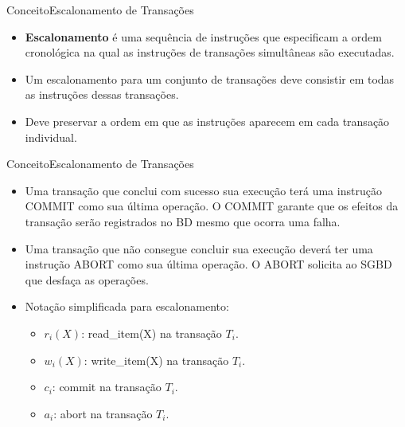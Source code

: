 \documentclass[t]{beamer}
\begin{document}

\begin{ftst}{Conceito}{Escalonamento de Transações}

\begin{itemize}
    \item \textbf{Escalonamento} é uma sequência de instruções que especificam a ordem cronológica na qual as instruções de transações simultâneas são executadas.
    \item Um escalonamento para um conjunto de transações deve consistir em todas as instruções dessas transações.
    \item Deve preservar a ordem em que as instruções aparecem em cada transação individual.
\end{itemize}
\end{ftst}


\begin{ftst}{Conceito}{Escalonamento de Transações}

\begin{itemize}
    \item Uma transação que conclui com sucesso sua execução terá uma instrução COMMIT como sua última operação. O COMMIT garante que os efeitos da transação serão registrados no BD mesmo que ocorra uma falha.
    \item Uma transação que não consegue concluir sua execução deverá ter uma instrução ABORT como sua última operação. O ABORT solicita ao SGBD que desfaça as operações.
    \item Notação simplificada para escalonamento:
    \begin{itemize}
        \item $r_i(X)$: read_item(X) na transação $T_i$.
        \item $w_i(X)$: write_item(X) na transação $T_i$.
        \item $c_i$: commit na transação $T_i$.
        \item $a_i$: abort na transação $T_i$.
    \end{itemize}
\end{itemize}
\end{ftst}

\end{document}
